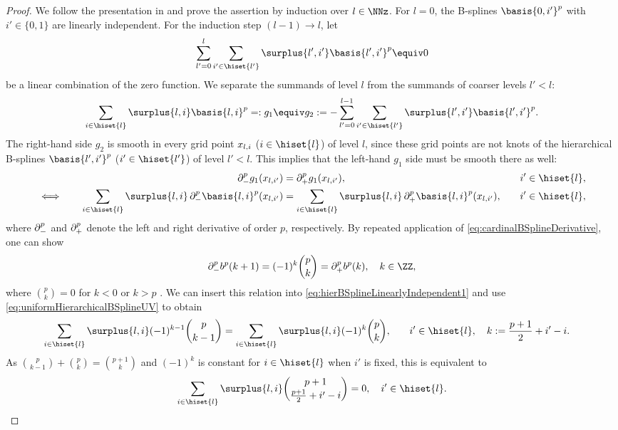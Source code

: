 \begin{proof}
  We follow the presentation in \cite{Valentin16Hierarchical} and
  prove the assertion by induction over $l \in \NNz$.
  For $l = 0$, the B-splines $\basis{0,i'}^p$ with $i' \in \{0, 1\}$
  are linearly independent.
  For the induction step $(l-1) \to l$, let
  \begin{equation}
    \sum_{l'=0}^l \sum_{i' \in \hiset{l'}} \surplus{l',i'} \basis{l',i'}^p
    \equiv 0
  \end{equation}
  be a linear combination of the zero function.
  We separate the summands of level $l$
  from the summands of coarser levels $l' < l$:
  \begin{equation}
    \label{eq:hierBSplineLinearlyIndependent3}
    \sum_{i \in \hiset{l}} \surplus{l,i} \basis{l,i}^p
    =: g_1 \equiv g_2 :=
    -\sum_{l'=0}^{l-1} \sum_{i' \in \hiset{l'}} \surplus{l',i'} \basis{l',i'}^p.
  \end{equation}
  The right-hand side $g_2$ is smooth in every grid point
  $x_{l,i}$ ($i \in \hiset{l}$) of level $l$,
  since these grid points are not knots of the hierarchical B-splines
  $\basis{l',i'}^p$ ($i' \in \hiset{l'}$) of level $l' < l$.
  This implies that the left-hand $g_1$ side must be smooth there as well:
  \begin{alignat}{3}
    &&
    \partialdiff_-^p g_1(\gp{l,i'})
    &= \partialdiff_+^p g_1(\gp{l,i'}),\quad
    &&i' \in \hiset{l},\\
    \label{eq:hierBSplineLinearlyIndependent1}
    \iff\quad&&
    \sum_{i \in \hiset{l}} \surplus{l,i}
    \partialdiff_-^p \basis{l,i}^p(\gp{l,i'})
    &= \sum_{i \in \hiset{l}} \surplus{l,i}
    \partialdiff_+^p \basis{l,i}^p(\gp{l,i'}),\quad
    &&i' \in \hiset{l},
  \end{alignat}
  where $\mathop{}\!\partial_-^p$ and $\mathop{}\!\partial_+^p$ denote the left and right
  derivative of order $p$, respectively.
  By repeated application of \eqref{eq:cardinalBSplineDerivative},
  one can show
  \begin{equation}
    \partialdiff_-^p b^p(k + 1)
    = (-1)^k \binom{p}{k}
    = \partialdiff_+^p b^p(k),\quad
    k \in \ZZ,
  \end{equation}
  where $\binom{p}{k} = 0$ for $k < 0$ or $k > p$
  \cite{Hoellig13Approximation}.
  We can insert this relation into
  \eqref{eq:hierBSplineLinearlyIndependent1}
  and use \eqref{eq:uniformHierarchicalBSplineUV} to obtain
  \begin{alignat}{2}
    \sum_{i \in \hiset{l}} \surplus{l,i} (-1)^{k-1} \binom{p}{k-1}
    &= \sum_{i \in \hiset{l}} \surplus{l,i} (-1)^k \binom{p}{k},\quad
    &&i' \in \hiset{l},\quad
    k := \frac{p+1}{2} + i' - i.
  \end{alignat}
  As $\binom{p}{k-1} + \binom{p}{k} = \binom{p+1}{k}$
  and $(-1)^k$ is constant for $i \in \hiset{l}$ when $i'$ is fixed,
  this is equivalent to
  \begin{equation}
    \label{eq:hierBSplineLinearlyIndependent2}
    \sum_{i \in \hiset{l}} \surplus{l,i}
    \binom{p+1}{\frac{p+1}{2} + i' - i} = 0,\quad
    i' \in \hiset{l}.
  \end{equation}
  

\end{proof}

